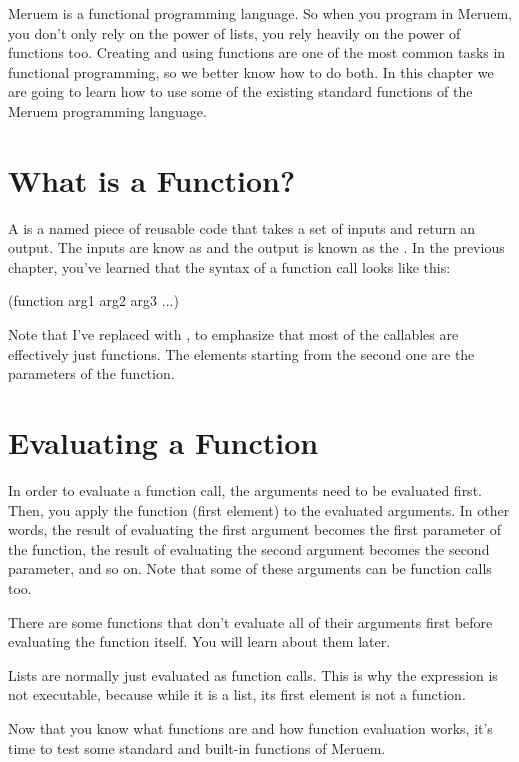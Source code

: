 Meruem is a functional programming language. So when you program in Meruem, you don't only rely on the power of lists, you rely heavily on the power of functions too. Creating and using functions are one of the most common tasks in functional programming, so we better know how to do both. In this chapter we are going to learn how to use some of the existing standard functions of the Meruem programming language.

\section{What is a Function?}
A  is a named piece of reusable code that takes a set of inputs and return an output. The inputs are know as  and the output is known as the . In the previous chapter, you've learned that the syntax of a function call looks like this:

\begin{QuasiLang}
(function arg1 arg2 arg3 ...)
\end{QuasiLang}

Note that I've replaced  with , to emphasize that most of the callables are effectively just functions. The elements starting from the second one are the parameters of the function. 

\section{Evaluating a Function}
In order to evaluate a function call, the arguments need to be evaluated first. Then, you apply the function (first element) to the evaluated arguments. In other words, the result of evaluating the first argument becomes the first parameter of the function, the result of evaluating the second argument becomes the second parameter, and so on. Note that some of these arguments can be function calls too. 

\begin{noteparagraph}
There are some functions that don't evaluate all of their arguments first before evaluating the function itself. You will learn about them later.
\end{noteparagraph}

Lists are normally just evaluated as function calls. This is why the expression  is not executable, because while it is a list, its first element is not a function.

Now that you know what functions are and how function evaluation works, it's time to test some standard and built-in functions of Meruem.

